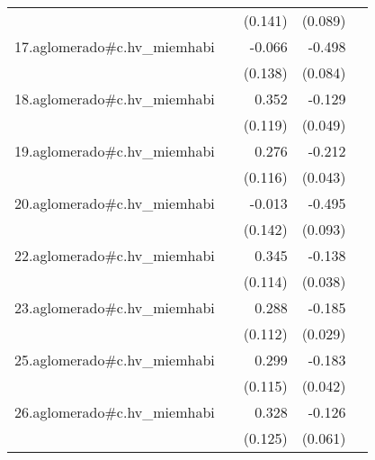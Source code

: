 {\begin{longtable}{l*{4}{D{.}{.}{-1}}}
            &                     &     (0.141)         &     (0.089)         &                     \\
\addlinespace
17.aglomerado#c.hv\_miemhabi&                     &      -0.066         &      -0.498\sym{***}&                     \\
            &                     &     (0.138)         &     (0.084)         &                     \\
\addlinespace
18.aglomerado#c.hv\_miemhabi&                     &       0.352\sym{**} &      -0.129\sym{**} &                     \\
            &                     &     (0.119)         &     (0.049)         &                     \\
\addlinespace
19.aglomerado#c.hv\_miemhabi&                     &       0.276\sym{*}  &      -0.212\sym{***}&                     \\
            &                     &     (0.116)         &     (0.043)         &                     \\
\addlinespace
20.aglomerado#c.hv\_miemhabi&                     &      -0.013         &      -0.495\sym{***}&                     \\
            &                     &     (0.142)         &     (0.093)         &                     \\
\addlinespace
22.aglomerado#c.hv\_miemhabi&                     &       0.345\sym{**} &      -0.138\sym{***}&                     \\
            &                     &     (0.114)         &     (0.038)         &                     \\
\addlinespace
23.aglomerado#c.hv\_miemhabi&                     &       0.288\sym{**} &      -0.185\sym{***}&                     \\
            &                     &     (0.112)         &     (0.029)         &                     \\
\addlinespace
25.aglomerado#c.hv\_miemhabi&                     &       0.299\sym{**} &      -0.183\sym{***}&                     \\
            &                     &     (0.115)         &     (0.042)         &                     \\
\addlinespace
26.aglomerado#c.hv\_miemhabi&                     &       0.328\sym{**} &      -0.126\sym{*}  &                     \\
            &                     &     (0.125)         &     (0.061)         &                     \\

\end{longtable}}
